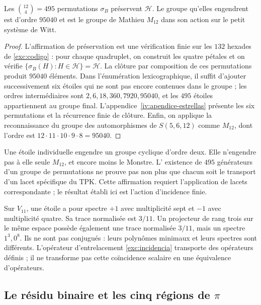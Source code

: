 \begin{proposition}
\label{exc:m12}
Les $\binom{12}4=495$ permutations $\sigma_B$ préservent $\mathcal H$.
Le groupe qu'elles engendrent est d'ordre $95040$ et est le groupe de Mathieu
$M_{12}$ dans son action sur le petit système de Witt.
\end{proposition}

\begin{proof}
L’affirmation de préservation est une vérification finie sur les
$132$ hexades de \eqref{exc:codigo} : pour chaque quadruplet, on construit
les quatre pétales et on vérifie
$\{\sigma_B(H):H\in\mathcal H\}=\mathcal H$.
La clôture par composition de ces permutations produit $95040$
éléments. Dans l’énumération lexicographique, il suffit d’ajouter successivement
six étoiles qui ne sont pas encore contenues dans le groupe ; les ordres intermédiaires
sont $2,6,18,360,7920,95040$, et les $495$ étoiles appartiennent au groupe
final. L’appendice~\ref{iv:apendice-estrellas} présente les six
permutations et la récurrence finie de clôture. Enfin, on applique la reconnaissance
du groupe des automorphismes de $S(5,6,12)$ comme $M_{12}$, dont l’ordre est
$12\cdot11\cdot10\cdot9\cdot8=95040$.
\end{proof}

Une étoile individuelle engendre un groupe cyclique d'ordre deux. Elle
n'engendre pas à elle seule $M_{12}$, et encore moins le Monstre. L'
existence de $495$ générateurs d'un groupe de permutations ne prouve pas non plus que
chacun soit le transport d'un lacet spécifique du TPK. Cette affirmation
requiert l'application de lacets correspondante ; le résultat établi ici
est l'action d'incidence finie.

\begin{remark}
Sur $V_{11}$, une étoile a pour spectre $+1$ avec multiplicité sept
et $-1$ avec multiplicité quatre. Sa trace normalisée est $3/11$.
Un projecteur de rang trois sur le même espace possède également une trace
normalisée $3/11$, mais un spectre $1^3,0^8$. Ils ne sont pas conjugués : leurs
polynômes minimaux et leurs spectres sont différents. L'opérateur d'entrelacement
\eqref{exc:incidencia} transporte des opérateurs définis ; il ne transforme pas
cette coïncidence scalaire en une équivalence d'opérateurs.
\end{remark}



\subsection{Le résidu binaire et les cinq régions de \texorpdfstring{$\pi$}{pi}}
\label{exc:cinco-regiones}

